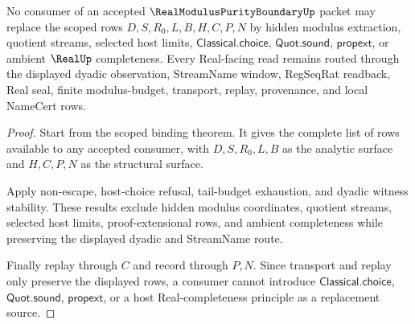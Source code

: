 \begin{theorem}
\label{thm:real-modulus-purity-boundary-source-nonescape}
No consumer of an accepted $\RealModulusPurityBoundaryUp$ packet may replace the scoped rows $D,S,R_0,L,B,H,C,P,N$ by hidden modulus extraction, quotient streams, selected host limits, $\mathsf{Classical.choice}$, $\mathsf{Quot.sound}$, $\mathsf{propext}$, or ambient $\RealUp$ completeness. Every Real-facing read remains routed through the displayed dyadic observation, StreamName window, RegSeqRat readback, Real seal, finite modulus-budget, transport, replay, provenance, and local NameCert rows.
\end{theorem}
\begin{proof}
Start from the scoped binding theorem. It gives the complete list of rows available to any accepted consumer, with $D,S,R_0,L,B$ as the analytic surface and $H,C,P,N$ as the structural surface.

Apply non-escape, host-choice refusal, tail-budget exhaustion, and dyadic witness stability. These results exclude hidden modulus coordinates, quotient streams, selected host limits, proof-extensional rows, and ambient completeness while preserving the displayed dyadic and StreamName route.

Finally replay through $C$ and record through $P,N$. Since transport and replay only preserve the displayed rows, a consumer cannot introduce $\mathsf{Classical.choice}$, $\mathsf{Quot.sound}$, $\mathsf{propext}$, or a host Real-completeness principle as a replacement source.
\end{proof}

